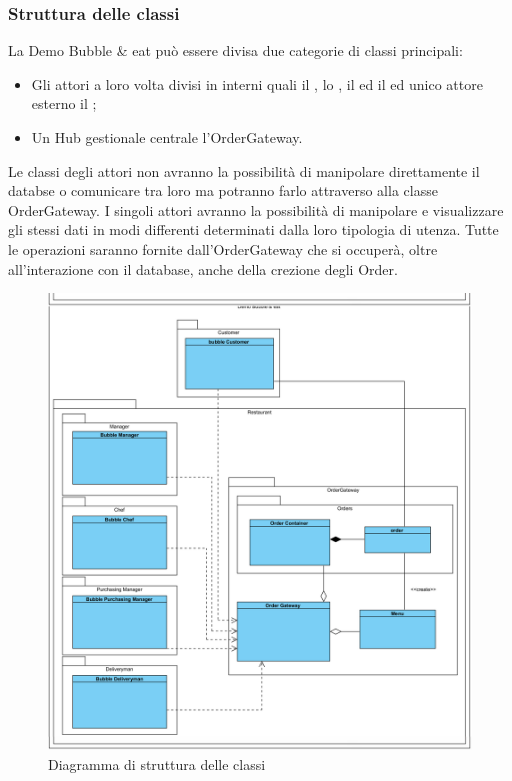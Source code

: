 \begin{samepage}
	\subsubsection{Struttura delle classi}
	La Demo Bubble \& eat può essere divisa due categorie di classi principali:
	\begin{itemize}
		\item Gli attori a loro volta divisi in interni quali il \Manager{}, lo \Chef{}, il \Deliveryman{} ed il \Purchasingmanager{} ed unico attore esterno il \Customer{};
		\item Un Hub gestionale centrale l’Order\-Gateway.
	\end{itemize}
	Le classi degli attori non avranno la possibilità di manipolare direttamente il databse o comunicare tra loro ma potranno farlo attraverso alla classe Order\-Gateway.
	I singoli attori avranno la possibilità di manipolare e visualizzare gli stessi dati in modi differenti determinati dalla loro tipologia di utenza.
	Tutte le operazioni saranno fornite dall’Order\-Gateway che si occuperà, oltre all’interazione con il database, anche della crezione degli Order.
	\nopagebreak
	\begin{figure}[H]
		\centering
		\includegraphics[width=13cm]{diagrammi_img/classi_e_package/demo_classes.png}
		\caption{Diagramma di struttura delle classi}
	\end{figure}
\end{samepage}

